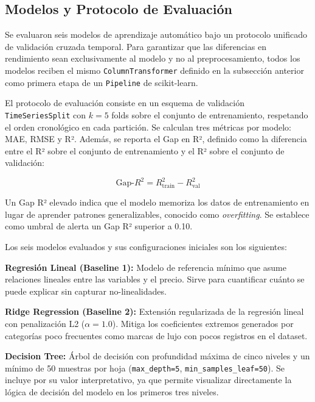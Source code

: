 \documentclass[conference]{IEEEtran}
\begin{document}
\subsection{Modelos y Protocolo de Evaluación}
\label{subsec:modelos}

Se evaluaron seis modelos de aprendizaje automático bajo un protocolo unificado de validación cruzada temporal. Para garantizar que las diferencias en rendimiento sean exclusivamente al modelo y no al preprocesamiento, todos los modelos reciben el mismo \texttt{ColumnTransformer} definido en la subsección anterior como primera etapa de un \texttt{Pipeline} de scikit-learn.

El protocolo de evaluación consiste en un esquema de validación \texttt{TimeSeriesSplit} con $k=5$ folds sobre el conjunto de entrenamiento, respetando el orden cronológico en cada partición. Se calculan tres métricas por modelo: MAE, RMSE y R². Además, se reporta el Gap en R², definido como la diferencia entre el R² sobre el conjunto de entrenamiento y el R² sobre el conjunto de validación:

\begin{equation}
    \text{Gap-}R^2 = R^2_{\text{train}} - R^2_{\text{val}}
    \label{eq:gap}
\end{equation}

Un Gap R² elevado indica que el modelo memoriza los datos de entrenamiento en lugar de aprender patrones generalizables, conocido como \textit{overfitting}. Se establece como umbral de alerta un Gap R² superior a 0.10.

Los seis modelos evaluados y sus configuraciones iniciales son los siguientes:

\textbf{Regresión Lineal (Baseline 1):} Modelo de referencia mínimo que asume relaciones lineales entre las variables y el precio. Sirve para cuantificar cuánto se puede explicar sin capturar no-linealidades.

\textbf{Ridge Regression (Baseline 2):} Extensión regularizada de la regresión lineal con penalización L2 ($\alpha{=}1.0$). Mitiga los coeficientes extremos generados por categorías poco frecuentes como marcas de lujo con pocos registros en el dataset.

\textbf{Decision Tree:} Árbol de decisión con profundidad máxima de cinco niveles y un mínimo de 50 muestras por hoja (\texttt{max\_depth=5}, \texttt{min\_samples\_leaf=50}). Se incluye por su valor interpretativo, ya que permite visualizar directamente la lógica de decisión del modelo en los primeros tres niveles.
\end{document}
